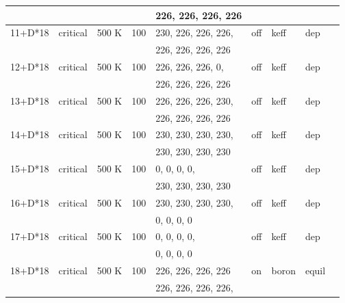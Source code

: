 \begin{table}[ht]
\begin{tabular}{|l|l|l|l|l|l|l|l|l|}
     &  &  &  & 226, 226, 226, 226  &  & & \\\hline
    11+D*18 & critical & 500 K & 100 & 230, 226, 226, 226, & off & keff & dep \\
     &  &  &  & 226, 226, 226, 226  &  & & \\\hline
    12+D*18 & critical & 500 K & 100 & 226, 226, 226, 0, & off & keff & dep \\
     &  &  &  & 226, 226, 226, 226  &  & & \\\hline
    13+D*18 & critical & 500 K & 100 & 226, 226, 226, 230, & off & keff & dep \\
     &  &  &  & 226, 226, 226, 226  &  & & \\\hline
    14+D*18 & critical & 500 K & 100 & 230, 230, 230, 230, & off & keff & dep \\
     &  &  &  & 230, 230, 230, 230  &  & & \\\hline
    15+D*18 & critical & 500 K & 100 & 0, 0, 0, 0, & off & keff & dep \\
     &  &  &  & 230, 230, 230, 230  &  & & \\\hline
    16+D*18 & critical & 500 K & 100 & 230, 230, 230, 230, & off & keff & dep \\
     &  &  &  & 0, 0, 0, 0  &  & & \\\hline
    17+D*18 & critical & 500 K & 100 & 0, 0, 0, 0, & off & keff & dep \\
     &  &  &  & 0, 0, 0, 0  &  & & \\\hline
    18+D*18 & critical & 500 K & 100 & 226, 226, 226, 226 & on & boron & equil \\
    &  &  &  & 226, 226, 226, 226,  &  & & \\\hline
    \end{tabular}
\end{table}
